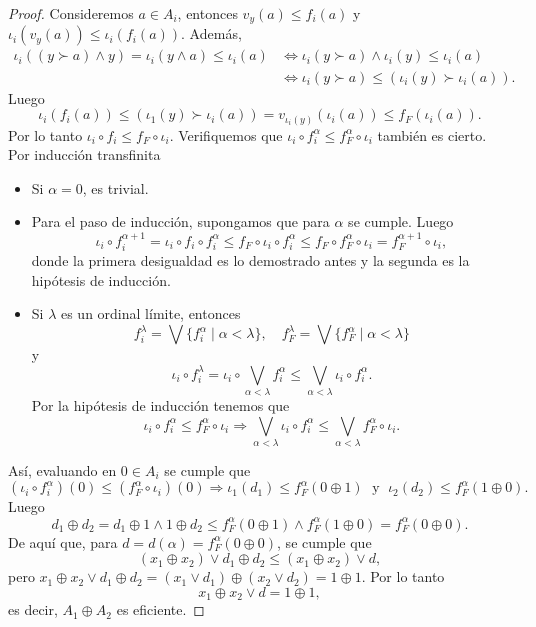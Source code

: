 \documentclass[12pt]{article}
\begin{document}
\begin{proof}
Consideremos $a\in A_i$, entonces $v_y(a)\leq f_i(a)$ y $\iota_i(v_y(a))\leq \iota_i(f_i(a))$. Además,
\[
\begin{split}
\iota_i((y\succ a)\wedge y)=\iota_i(y\wedge a)\leq \iota_i(a)& \Leftrightarrow \iota_i(y\succ a)\wedge \iota_i(y)\leq \iota_i(a)\\
& \Leftrightarrow \iota_i(y\succ a)\leq (\iota_i(y)\succ \iota_i(a)).
\end{split}
\]
Luego 
\[
\iota_i(f_i(a))\leq (\iota_1(y)\succ \iota_i(a))=v_{\iota_i(y)}(\iota_i(a))\leq f_F(\iota_i(a)).
\]
Por lo tanto $\iota_i\circ f_i\leq f_F\circ \iota_i$. Verifiquemos que $\iota_i\circ f_i^\alpha\leq f_F^\alpha\circ \iota_i$ también es cierto. Por inducción transfinita 
\begin{itemize}
\item Si $\alpha=0$, es trivial.
\item Para el paso de inducción, supongamos que para $\alpha$ se cumple. Luego
\[
\iota_i\circ f_i^{\alpha+1}=\iota_i\circ f_i\circ f_i^{\alpha}\leq  f_F\circ \iota_i\circ f_i^\alpha\leq f_F\circ f^\alpha_F\circ \iota_i=f^{\alpha+1}_F\circ \iota_i,
\]
donde la primera desigualdad es lo demostrado antes y la segunda es la hipótesis de inducción.
\item Si $\lambda$ es un ordinal límite, entonces
\[
f_i^\lambda=\bigvee\{f_i^\alpha\mid \alpha<\lambda\}, \quad f^\lambda_F=\bigvee\{f^\alpha_F\mid \alpha<\lambda\}
\]
y
\[  
\iota_i\circ f_i^\lambda=\iota_i\circ \bigvee_{\alpha<\lambda}f_i^\alpha\leq\bigvee_{\alpha<\lambda}\iota_i\circ f_i^\alpha.
\]
Por la hipótesis de inducción tenemos que
\[
\iota_i\circ f_i^\alpha\leq f_F^\alpha\circ \iota_i\Rightarrow \bigvee_{\alpha<\lambda}\iota_i\circ f_i^\alpha\leq \bigvee_{\alpha<\lambda} f_F^\alpha\circ \iota_i.
\]
\end{itemize}
Así, evaluando en $0\in A_i$ se cumple que
\[
(\iota_i\circ f_i^\alpha)(0)\leq (f^\alpha_F\circ \iota_i)(0)\Rightarrow \iota_1(d_1)\leq f^\alpha_F(0\oplus 1)\;\mbox{ y }\;\iota_2(d_2)\leq f^\alpha_F(1\oplus 0).
\]
Luego 
\[
d_1\oplus d_2=d_1\oplus 1\wedge 1\oplus d_2\leq f^\alpha_F(0\oplus 1)\wedge f^\alpha_F(1\oplus 0)=f^\alpha_F(0\oplus 0). 
\]
De aquí que, para $d=d(\alpha)=f^\alpha_F(0\oplus 0)$, se cumple que
\[
(x_1\oplus x_2)\vee d_1\oplus d_2\leq (x_1\oplus x_2)\vee d,
\]
pero $x_1\oplus x_2\vee d_1\oplus d_2=(x_1\vee d_1)\oplus (x_2\vee d_2)=1\oplus 1$. Por lo tanto 
\[
x_1\oplus x_2\vee d=1\oplus 1,
\]
es decir, $A_1\oplus A_2$ es eficiente.
\end{proof}
\end{document}
